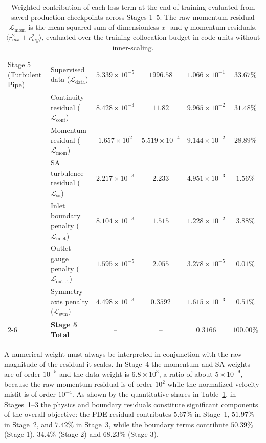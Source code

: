 \documentclass[11pt,a4paper]{article}
\begin{document}
\begin{table}[H]
{\begin{tabular}{llcccc}
Stage 5 (Turbulent Pipe) & Supervised data ($\mathcal{L}_{\mathrm{data}}$) & $5.339\times 10^{-5}$ & $1996.58$ & $1.066\times 10^{-1}$ & $33.67\%$ \\
& Continuity residual ($\mathcal{L}_{\mathrm{cont}}$) & $8.428\times 10^{-3}$ & $11.82$ & $9.965\times 10^{-2}$ & $31.48\%$ \\
& Momentum residual ($\mathcal{L}_{\mathrm{mom}}$) & $1.657\times 10^{2}$ & $5.519\times 10^{-4}$ & $9.144\times 10^{-2}$ & $28.89\%$ \\
& SA turbulence residual ($\mathcal{L}_{\mathrm{sa}}$) & $2.217\times 10^{-3}$ & $2.233$ & $4.951\times 10^{-3}$ & $1.56\%$ \\
& Inlet boundary penalty ($\mathcal{L}_{\mathrm{inlet}}$) & $8.104\times 10^{-3}$ & $1.515$ & $1.228\times 10^{-2}$ & $3.88\%$ \\
& Outlet gauge penalty ($\mathcal{L}_{\mathrm{outlet}}$) & $1.595\times 10^{-5}$ & $2.055$ & $3.278\times 10^{-5}$ & $0.01\%$ \\
& Symmetry axis penalty ($\mathcal{L}_{\mathrm{sym}}$) & $4.498\times 10^{-3}$ & $0.3592$ & $1.615\times 10^{-3}$ & $0.51\%$ \\
\cmidrule{2-6}
& \textbf{Stage 5 Total} & -- & -- & $\mathbf{0.3166}$ & $\mathbf{100.00\%}$ \\
\bottomrule
\end{tabular}%
}
\caption{Weighted contribution of each loss term at the end of training evaluated from saved production checkpoints across Stages 1--5. The raw momentum residual $\mathcal{L}_{\mathrm{mom}}$ is the mean squared sum of dimensionless $x$- and $y$-momentum residuals, $\langle r_{mx}^2 + r_{my}^2 \rangle$, evaluated over the training collocation budget in code units without inner-scaling.}
\label{tab:weighted_loss_end_training}
\end{table}

A numerical weight must always be interpreted in conjunction with the raw magnitude of the residual it scales. In Stage~4 the momentum and SA weights are of order $10^{-5}$ and the data weight is $6.8\times 10^3$, a ratio of about $5\times 10^{-9}$, because the raw momentum residual is of order $10^2$ while the normalized velocity misfit is of order $10^{-4}$. As shown by the quantitative shares in Table~\ref{tab:weighted_loss_end_training}, in Stages~1--3 the physics and boundary residuals constitute significant components of the overall objective: the PDE residual contributes $5.67\%$ in Stage~1, $51.97\%$ in Stage~2, and $7.42\%$ in Stage~3, while the boundary terms contribute $50.39\%$ (Stage 1), $34.4\%$ (Stage 2) and $68.23\%$ (Stage 3).
\end{document}

